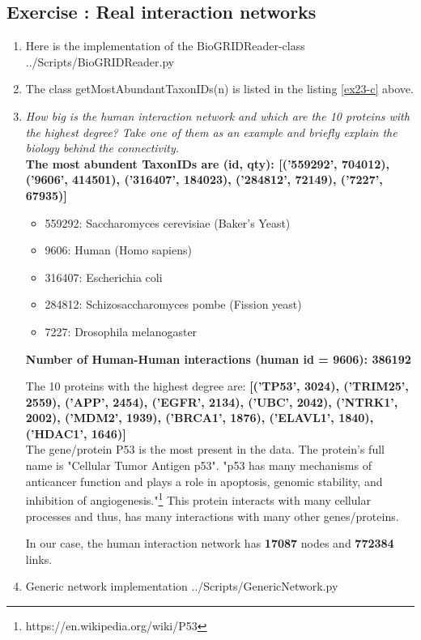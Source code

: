 \documentclass[10pt,a4paper]{article}
\newcommand{\exercise}[1]
{
  \stepcounter{subsection}
  \subsection*{Exercise \thesubsection: #1}

}
\begin{document}
\newpage
\exercise{Real interaction networks}
\begin{enumerate}
	\item Here is the implementation of the BioGRIDReader-class
	 {../Scripts/BioGRIDReader.py}
	
	
	
	\item The class getMostAbundantTaxonIDs(n) is listed in the listing \ref{ex23-c} above. 
	
	
	\item \textit{How big is the human interaction network and which are the 10 proteins with the highest
		degree? Take one of them as an example and briefly explain the biology behind the
		connectivity.}\\
	
	
	\textbf{The most abundent TaxonIDs are (id, qty):  [('559292', 704012), ('9606', 414501), ('316407', 184023), ('284812', 72149), ('7227', 67935)]}
	
	\begin{itemize}
		\item 559292: Saccharomyces cerevisiae (Baker's Yeast)
		\item   9606: Human (Homo sapiens) 
		\item 316407: Escherichia coli
		\item 284812: Schizosaccharomyces pombe (Fission yeast)
		\item   7227: Drosophila melanogaster
	\end{itemize}
	
	\textbf{Number of Human-Human interactions (human id = 9606):  386192}
	
	The  10  proteins with the highest degree are: 
	\textbf{[('TP53', 3024), ('TRIM25', 2559), ('APP', 2454), ('EGFR', 2134), ('UBC', 2042), ('NTRK1', 2002), ('MDM2', 1939), ('BRCA1', 1876), ('ELAVL1', 1840), ('HDAC1', 1646)]}\\
	
	
	The gene/protein P53 is the most present in the data. The protein's full name is "Cellular Tumor Antigen p53". "p53 has many mechanisms of anticancer function and plays a role in apoptosis, genomic stability, and inhibition of angiogenesis."\footnote{https://en.wikipedia.org/wiki/P53} This protein interacts with many cellular processes and thus, has many interactions with many other genes/proteins. 
	
	In our case, the human interaction network has \textbf{17087} nodes and \textbf{772384} links.
	
	\item Generic network implementation 
	 {../Scripts/GenericNetwork.py}
	
	
	
\end{enumerate}	
	
\end{document}
